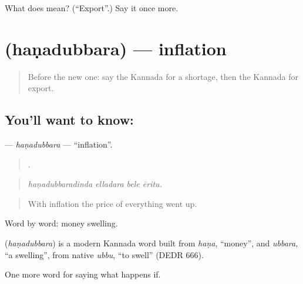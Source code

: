 \begin{tcolorbox}[breakable,colback=teal!4,colframe=teal!35!black,title={Before you move on}]
What does  mean? (\textquotedblleft{}Export\textquotedblright{}.) Say it once more.
\end{tcolorbox}
\section[\texorpdfstring{\kn{ಹಣದುಬ್ಬರ} (haṇadubbara)}{ಹಣದುಬ್ಬರ (haṇadubbara)}]{ (haṇadubbara) — inflation}

\label{lesson:KA-C421-hanadubbara}



\begin{quote}
Before the new one: say the Kannada for a shortage, then the Kannada for export.
\end{quote}

\subsection*{You'll want to know: }
\textbf{} — \emph{haṇadubbara} — \textquotedblleft{}inflation\textquotedblright{}.

\begin{quote}
   .
\end{quote}

\begin{quote}
\emph{haṇadubbaradinda elladara bele ēritu.}
\end{quote}

\begin{quote}
With inflation the price of everything went up.
\end{quote}

Word by word: money swelling.

\begin{cousinweb}
\textbf{} (\emph{haṇadubbara}) is a modern Kannada word built from \emph{haṇa}, \textquotedblleft{}money\textquotedblright{}, and \emph{ubbara}, \textquotedblleft{}a swelling\textquotedblright{}, from native \emph{ubbu}, \textquotedblleft{}to swell\textquotedblright{} (DEDR 666).
\end{cousinweb}

\begin{grammarlens}[title={What you've built}]
One more word for saying what happens if.
\end{grammarlens}


